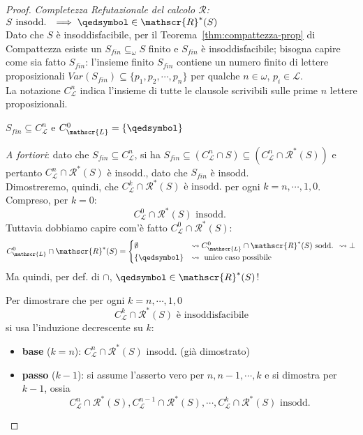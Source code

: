 \begin{proof}
\textit{Completezza Refutazionale del calcolo $\mathscr{R}$: $S \text{ insodd. } \implies \qedsymbol \in \mathscr{R}^*(S)$} \\
Dato che $S$ è insoddisfacibile, per il Teorema~\ref{thm:compattezza-prop} di Compattezza esiste un $S_{fin} \subseteq_{\omega} S$ finito e $S_{fin}$ è insoddisfacibile; 
bisogna capire come sia fatto $S_{fin}$: l'insieme finito $S_{fin}$ contiene un numero finito di lettere proposizionali $Var(S_{fin}) \subseteq \{p_1, p_2, \cdots, p_n\}$ per qualche $n \in  \omega$, $p_i \in \mathscr{L}$. \\
La notazione $C^{n}_\mathscr{L}$ indica l'insieme di tutte le clausole scrivibili sulle prime $n$ lettere proposizionali.
\begin{oss}
$S_{fin} \subseteq C^{n}_\mathscr{L}$ e $C^{0}_\mathscr{L} = \{ \qedsymbol \}$
\end{oss}
\textit{A fortiori}: dato che $S_{fin} \subseteq C^{n}_\mathscr{L}$, si ha $S_{fin} \subseteq (C^{n}_\mathscr{L} \cap S) \subseteq (C_\mathscr{L}^{n} \cap \mathscr{R}^*(S))$ e pertanto $C^{n}_\mathscr{L} \cap \mathscr{R}^*(S)$ è insodd., dato che $S_{fin}$ è insodd. \\
Dimostreremo, quindi, che $C^k_\mathscr{L} \cap \mathscr{R}^*(S) \text{ è insodd.}$ per ogni $ k = n, \cdots, 1,0$. Compreso, per $k = 0$:
$$
C^{0}_\mathscr{L} \cap \mathscr{R}^*(S) \text{ insodd. }
$$
Tuttavia dobbiamo capire com'è fatto $C^0_\mathscr{L} \cap \mathscr{R}^*(S)$:
$$
C^{0}_\mathscr{L} \cap \mathscr{R}^*(S) = 
\begin{cases}
  \emptyset  & \leadsto C^0_\mathscr{L} \cap \mathscr{R}^*(S) \text{ sodd. } \leadsto \bot \\
  \{\qedsymbol\} & \leadsto \text{ unico caso possibile }
\end{cases}
$$
Ma quindi, per def. di $\cap$, $\qedsymbol \in \mathscr{R}^*(S)$!

Per dimostrare che per ogni $k = n, \cdots, 1, 0$ 
$$
C^k_\mathscr{L} \cap \mathscr{R}^*(S) \text{ è insoddisfacibile} 
$$
si usa l'induzione decrescente su $k$:
\begin{itemize}
\item \textbf{base} ($k = n$): $C^n_\mathscr{L} \cap \mathscr{R}^*(S)$ insodd. (già dimostrato)
\item \textbf{passo} ($k-1$): si assume l'asserto vero per $n, n-1, \cdots, k$ e si dimostra per $k-1$, ossia 
$$
C^n_\mathscr{L} \cap \mathscr{R}^*(S), C^{n-1}_\mathscr{L} \cap \mathscr{R}^*(S), \cdots, C^k_\mathscr{L} \cap \mathscr{R}^*(S) \text{  insodd.}
$$


\end{itemize}
\end{proof}
